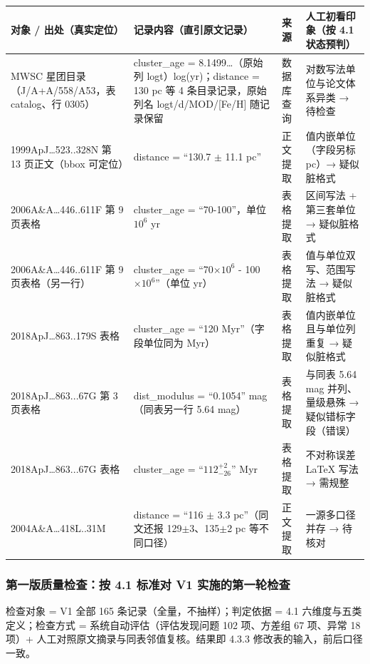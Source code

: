 \begin{longtable}{@{}p{3.3cm}p{4.2cm}p{1.7cm}p{3.9cm}@{}}
\toprule
对象 / 出处（真实定位） & 记录内容（直引原文记录） & 来源 & 人工初看印象（按 4.1 状态预判） \\
\midrule
MWSC 星团目录（J/A+A/558/A53，表 catalog、行 0305） & cluster\_age = 8.1499…（原始列 logt）log(yr)；distance = 130 pc 等 4 条目录记录，原始列名 logt/d/MOD/[Fe/H] 随记录保留 & 数据库查询 & 对数写法单位与论文体系异类 → 待检查 \\
1999ApJ…523..328N 第 13 页正文（bbox 可定位） & distance = “130.7 $\pm$ 11.1 pc” & 正文提取 & 值内嵌单位（字段另标 pc）→ 疑似脏格式 \\
2006A\&A…446..611F 第 9 页表格 & cluster\_age = “70-100”，单位 $10^{6}$ yr & 表格提取 & 区间写法 + 第三套单位 → 疑似脏格式 \\
2006A\&A…446..611F 第 9 页表格（另一行） & cluster\_age = “70$\times10^{6}$ - 100$\times10^{6}$”（单位 yr） & 表格提取 & 值与单位双写、范围写法 → 疑似脏格式 \\
2018ApJ…863..179S 表格 & cluster\_age = “120 Myr”（字段单位同为 Myr） & 表格提取 & 值内嵌单位且与单位列重复 → 疑似脏格式 \\
2018ApJ…863...67G 第 3 页表格 & dist\_modulus = “0.1054” mag（同表另一行 5.64 mag） & 表格提取 & 与同表 5.64 mag 并列、量级悬殊 → 疑似错标字段（错误） \\
2018ApJ…863...67G 表格 & cluster\_age = “$112^{+2}_{-26}$” Myr & 表格提取 & 不对称误差 LaTeX 写法 → 需规整 \\
2004A\&A…418L..31M & distance = “116 $\pm$ 3.3 pc”（同文还报 129$\pm$3、135$\pm$2 pc 等不同口径） & 正文提取 & 一源多口径并存 → 待核对 \\
\bottomrule
\end{longtable}

\subsubsection{第一版质量检查：按 4.1 标准对 V1 实施的第一轮检查}

检查对象 = V1 全部 165 条记录（全量，不抽样）；判定依据 = 4.1 六维度与五类定义；检查方式 = 系统自动评估（评估发现问题 102 项、方差组 67 项、异常 18 项）+ 人工对照原文摘录与同表邻值复核。结果即 4.3.3 修改表的输入，前后口径一致。


